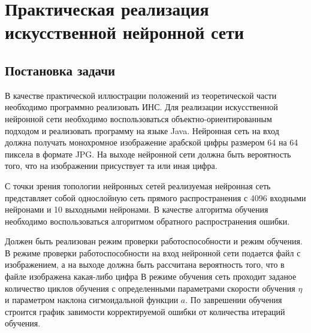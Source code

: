 \chapter{Практическая реализация искусственной нейронной сети}	
\section{Постановка задачи}

В качестве практической иллюстрации положений из теоретической части необходимо программно реализовать ИНС.
Для реализации искусственной нейронной сети необходимо воспользоваться объектно-ориентированным подходом и реализовать программу на языке Java.
Нейронная сеть на вход должна получать монохромное изображение арабской цифры размером 64 на 64 пиксела в формате JPG.
На выходе нейронной сети должна быть вероятность того, что на изображении присуствует та или иная цифра.

С точки зрения топологии нейронных сетей реализуемая нейронная сеть представляет собой однослойную сеть прямого распространения с 4096 входными нейронами и 10 выходными нейронами.
В качестве алгоритма обучения необходимо воспользоваться алгоритмом обратного распространения ошибки.

Должен быть реализован режим проверки работоспособности и режим обучения.
В режиме проверки работоспособности на вход нейронной сети подается файл с изображением, а на выходе должна быть рассчитана вероятность того, что в файле изображена какая-либо цифра
В режиме обучения сеть проходит заданое количество циклов обучения с определенными параметрами скорости обучения $\eta$ и параметром наклона сигмоидальной функции $a$.
По заврешении обучения строится график завимости корректируемой ошибки от количества итераций обучения.

